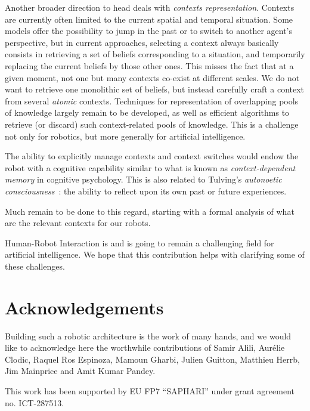 \documentclass[preprint,3p,times]{elsarticle}
\begin{document}
Another broader direction to head deals with \emph{contexts representation}.
Contexts are currently often limited to the current spatial and temporal
situation. Some models offer the possibility to jump in the past or to
switch to another agent's perspective, but in current approaches, selecting a
context always basically consists in retrieving a set of beliefs corresponding
to a situation, and temporarily replacing the current beliefs by those other
ones. This misses the fact that at a given moment, not one but many contexts
co-exist at different scales. We do not want to retrieve one monolithic set of
beliefs, but instead carefully craft a context from several \emph{atomic}
contexts. Techniques for representation of overlapping pools of knowledge
largely remain to be developed, as well as efficient algorithms to retrieve (or
discard) such context-related pools of knowledge. This is a challenge not only
for robotics, but more generally for artificial intelligence.

The ability to explicitly manage contexts and context switches would endow the
robot with a cognitive capability similar to what is known as
\emph{context-dependent memory} in cognitive psychology. This is also related
to Tulving's \emph{autonoetic consciousness}~\cite{Tulving1985a}: the ability
to reflect upon its own past or future experiences.

Much remain to be done to this regard, starting with a formal analysis of what
are the relevant contexts for our robots.

Human-Robot Interaction is and is going to remain a challenging field for
artificial intelligence. We hope that this contribution helps with clarifying
some of these challenges.

\section*{Acknowledgements}

Building such a robotic architecture is the work of many hands, and we would
like to acknowledge here the worthwhile contributions of Samir Alili, Aurélie
Clodic, Raquel Ros Espinoza, Mamoun Gharbi, Julien Guitton, Matthieu Herrb, Jim
Mainprice and Amit Kumar Pandey.

This work has been supported by EU FP7 ``SAPHARI'' under grant agreement no.
ICT-287513.



%

\end{document}
